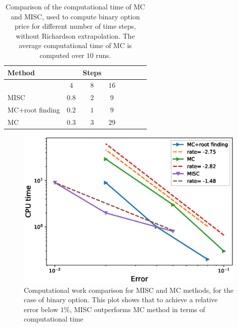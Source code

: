 \FloatBarrier

\begin{table}[h!]
	\centering
	\begin{tabular}{l*{6}{c}r}
		\toprule[1.5pt]
	Method & & Steps  &     \\
	\hline
		         & $4$ & $8$ & $16$ &   \\
		\hline
		MISC   & $0.8$ & $2$ & $9$  \\
		\hline
		MC+root finding     & $0.2$ & $1$ & $9$  \\
		\hline 
		MC     & $0.3$ & $3$ & $29$  \\
				\bottomrule[1.25pt]
	\end{tabular}
	\caption{Comparison of the computational time of  MC and MISC, used to compute binary option price  for different number of time steps, without Richardson extrapolation. The average computational time of MC is computed over $10$ runs.}
	\label{Comparsion of the computational time of  MC and MISC, used to compute Binary option price  for different number of time steps, without Richardson extrapolation}
\end{table}



\FloatBarrier
\begin{figure}[h!]
\centering
\includegraphics[width=0.4\linewidth]{./figures/Binary_Complexity_rates/error_vs_time}
	\caption{Computational work comparison for MISC and MC methods, for the case of binary  option. This plot shows that to achieve a relative error below $1\%$, MISC outperforms  MC method in terms of computational time}
	\label{fig:Complexity plot for MC and MISC , Binary, Non rich}
\end{figure}

